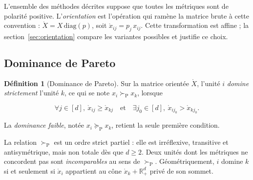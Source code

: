 \documentclass[11pt,a4paper]{article}
\theoremstyle{definition}
\newtheorem{definition}{Définition}[section]
\theoremstyle{remark}
\newcommand{\R}{\mathbb{R}}
\newcommand{\pareto}{\succ_{\mathrm{P}}}
\newcommand{\paretoeq}{\succeq_{\mathrm{P}}}
\newcommand{\Xor}{\mathring{X}}
\begin{document}
\bigskip

L'ensemble des méthodes décrites suppose que toutes les métriques sont de polarité
positive. L'\emph{orientation} est l'opération qui ramène la matrice brute à cette
convention : $\Xor = X\,\mathrm{diag}(p)$, soit $\mathring{x}_{ij} = p_j\,x_{ij}$. Cette
transformation est affine ; la section~\ref{sec:orientation} compare les variantes
possibles et justifie ce choix.

\bigskip

\subsection{Dominance de Pareto}

\medskip

\begin{definition}[Dominance de Pareto]
  \label{def:pareto}
  Sur la matrice orientée $\Xor$, l'unité $i$ \emph{domine strictement} l'unité $k$, ce
  qui se note $x_i \pareto x_k$, lorsque

  \medskip

  \[
    \forall j \in [d],\ \mathring{x}_{ij} \ge \mathring{x}_{kj}
    \quad \text{et} \quad
    \exists j_0 \in [d],\ \mathring{x}_{ij_0} > \mathring{x}_{kj_0}.
  \]

  \bigskip

  La \emph{dominance faible}, notée $x_i \paretoeq x_k$, retient la seule première
  condition.
\end{definition}

\bigskip

La relation $\pareto$ est un ordre strict partiel : elle est irréflexive, transitive et
antisymétrique, mais non totale dès que $d \ge 2$. Deux unités dont les métriques ne
concordent pas sont \emph{incomparables} au sens de $\pareto$. Géométriquement, $i$ domine
$k$ si et seulement si $\mathring{x}_i$ appartient au cône $\mathring{x}_k + \R_+^d$ privé
de son sommet.

\medskip
\end{document}
